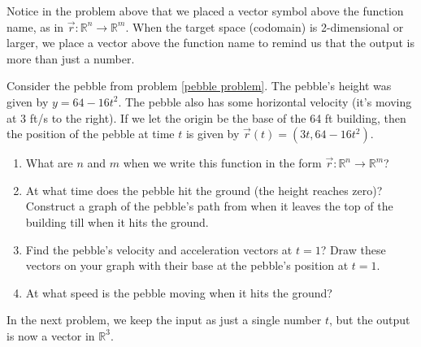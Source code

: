Notice in the problem above that we placed a vector symbol above the function name, as in $\vec r\colon {\mathbb{R}}^n\to {\mathbb{R}}^m$.  When the target space (codomain) is 2-dimensional or larger, we place a vector above the function name to remind us that the output is more than just a number.

\begin{problem}%
%
Consider the pebble from problem \ref{pebble problem}. The pebble's height was given by $y=64-16t^2$.  The pebble also has some horizontal velocity (it's moving at 3 ft/s to the right).  If we let the origin be the base of the 64 ft building, then the position of the pebble at time $t$ is given by $\vec r(t) = (3t, 64-16t^2)$.
 \begin{enumerate}
  \item What are $n$ and $m$ when we write this function in the form  $\vec r\colon {\mathbb{R}}^n\to {\mathbb{R}}^m$?
  \item At what time does the pebble hit the ground (the height reaches zero)?  Construct a graph of the pebble's path from when it leaves the top of the building till when it hits the ground.
  \item{}%
 Find the pebble's velocity and acceleration vectors at $t=1$? Draw these vectors on your graph with their base at the pebble's position at $t=1$. 
  \item At what speed is the pebble moving when it hits the ground?
 \end{enumerate}
\end{problem}

In the next problem, we keep the input as just a single number $t$, but the output is now a vector in $\mathbb{R}^3$.

